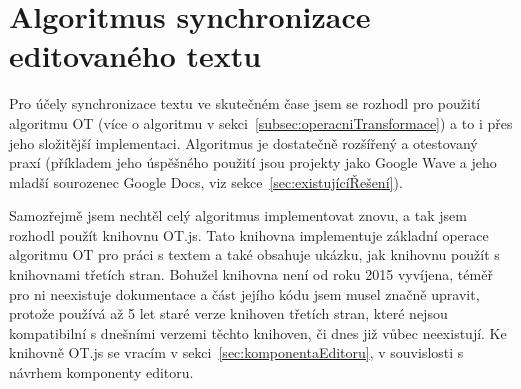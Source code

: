 
\section{Algoritmus synchronizace editovaného textu}\label{sec:synchronizaceEditovanéhoTextu}

Pro účely synchronizace textu ve skutečném čase jsem se rozhodl pro použití algoritmu \gls{OT} (více o algoritmu v sekci~\ref{subsec:operacniTransformace}) a to i přes jeho složitější implementaci.
Algoritmus je dostatečně rozšířený a otestovaný praxí (příkladem jeho úspěšného použití jsou projekty jako Google Wave a jeho mladší sourozenec Google Docs, viz sekce~\ref{sec:existujícíŘešení}).

Samozřejmě jsem nechtěl celý algoritmus implementovat znovu, a tak jsem rozhodl použít knihovnu OT.js.
Tato knihovna implementuje základní operace algoritmu \gls{OT} pro práci s textem a také obsahuje ukázku, jak knihovnu použít s knihovnami třetích stran.
Bohužel knihovna není od roku 2015 vyvíjena, téměř pro ni neexistuje dokumentace a část jejího kódu jsem musel značně upravit, protože používá až 5 let staré verze knihoven třetích stran, které nejsou kompatibilní s dnešními verzemi těchto knihoven, či dnes již vůbec neexistují.
Ke knihovně OT.js se vracím v sekci~\ref{sec:komponentaEditoru}, v souvislosti s návrhem komponenty editoru.
